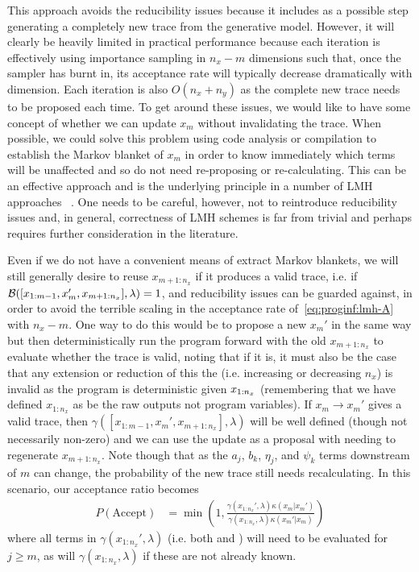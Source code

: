 This approach avoids the reducibility issues because it
includes as a possible step generating a completely new trace from the generative model.  However,
it will clearly be heavily limited in practical performance because each iteration
is effectively using importance sampling in $n_x-m$ dimensions such that, once the sampler has burnt in,
its acceptance rate will typically decrease dramatically with dimension.  Each iteration is also $O(n_x+n_y)$ as
the complete new trace needs to be proposed each time.  To get around these issues, we would like
to have some concept of whether we can update $x_m$ without invalidating the trace.  When possible,
we could solve this problem using code analysis or compilation to establish the Markov blanket of $x_m$ in order to know
immediately which terms will be unaffected and so do not need re-proposing or re-calculating.
This can be an effective approach and is the underlying principle in a number of LMH 
approaches ~\cite{yang2014generating,mansinghka2014venture,ritchie2016c3}.  One needs to be
careful, however, not to reintroduce reducibility issues and, in general, correctness of LMH schemes is
far from trivial and perhaps requires further consideration in the literature.

Even if we do not have a convenient means of extract Markov blankets, we will still generally desire
to reuse $x_{m+1:n_x}$ if it produces a valid trace, i.e. if $\mathcal{B} ([x_{1:m-1},x_m',x_{m+1:n_x}],\lambda)=1$, and reducibility
issues can be guarded against, in order to avoid the terrible scaling in the acceptance rate 
of~\ref{eq:proginf:lmh-A}  with $n_x-m$.  One way to do this would be to propose
a new $x_m'$ in the same way but then deterministically run the program forward with the old
$x_{m+1:n_x}$ to evaluate whether the trace is valid, noting that if it is, it must also be the case that any 
extension or reduction of this the (i.e. increasing or decreasing
$n_x$) is invalid as the program is deterministic given $x_{1:n_x}$ (remembering that we
have defined $x_{1:n_x}$ as be the raw \sample outputs not program variables).  If $x_m \rightarrow x_m'$ gives
a valid trace, then $\gamma([x_{1:m-1},x_m',x_{m+1:n_x}],\lambda)$ will be well defined (though not necessarily
non-zero) and we can use the update as a proposal with needing to regenerate $x_{m+1:n_x}$.  Note though
that as the $a_j$, $b_k$, $\eta_j$, and $\psi_k$ terms downstream of $m$ can change, the 
probability of the new trace still needs recalculating.  In this scenario, our acceptance ratio becomes
\begin{align}
  P(\text{Accept}) &= \min\left(1, \frac{\gamma(x_{1:n_x}',\lambda) \kappa(x_m | x_{m}')  }
  {\gamma(x_{1:n_x},\lambda) \kappa(x_m' | x_{m})  }\right)
\end{align}
where all terms in $\gamma(x_{1:n_x}',\lambda)$ (i.e. both \sample and \observe) will need
to be evaluated for $j\ge m$, as will $\gamma(x_{1:n_x},\lambda)$ if these are not already known. 

